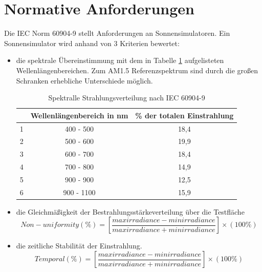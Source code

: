 \documentclass[a4paper,bibtotoc,oneside]{scrbook}
\begin{document}
\section{Normative Anforderungen}\thispagestyle{empty}
Die IEC Norm 60904-9 \cite{norm9} stellt Anforderungen an Sonnensimulatoren. Ein Sonnensimulator wird anhand von 3 Kriterien bewertet: 
\begin{itemize}
\item die spektrale Übereinstimmung mit dem in Tabelle \ref{TabS1} aufgelisteten Wellenlängenbereichen. Zum AM1.5 Referenzspektrum sind durch die großen Schranken erhebliche Unterschiede möglich.
\begin{table}[htbp]
\centering
\begin{tabular}{ | c | c | c |}\hline
{\bf } & {\bf Wellenlängenbereich in nm} & {\bf \% der totalen Einstrahlung}\\ \hline
\hline
1  & 400 - 500 & 18,4 \\ \hline
2  & 500 - 600 & 19,9\\ \hline
3  & 600 - 700 & 18,4\\ \hline
4  & 700 - 800 & 14,9\\ \hline
5  & 900 - 900 & 12,5\\ \hline
6  & 900 - 1100 & 15,9\\ \hline
\end{tabular}
\caption{Spektralle Strahlungsverteilung nach IEC 60904-9}\label{TabS1}
\end{table}
\item die Gleichmäßigkeit der Bestrahlungsstärkeverteilung über die Testfläche
	\begin{equation}
 Non-uniformity (\%) = [\frac{max irradiance - min irradiance}{max irradiance + min irradiance}] \times (100\%)
\end{equation}
\item die zeitliche Stabilität der Einstrahlung.
\begin{equation}
 Temporal (\%) = [\frac{max irradiance - min irradiance}{max irradiance + min irradiance}] \times (100\%)
\end{equation}
\end{itemize}
\end{document}
